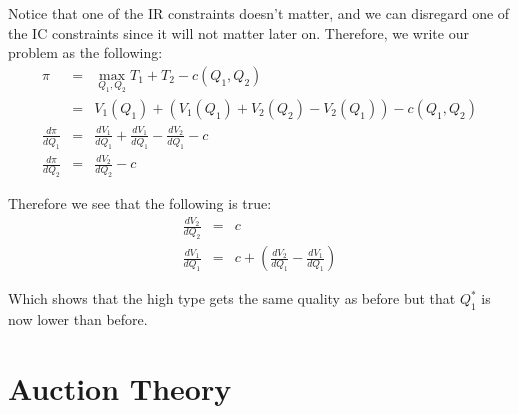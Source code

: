 \documentclass[12pt]{article}
\begin{document}
Notice that one of the IR constraints doesn't matter, and we can disregard one of the IC constraints since it will not matter later on. Therefore, we write our problem as the following:
\begin{eqnarray}
\pi &=& \max_{Q_1, Q_2} T_1 + T_2 - c(Q_1, Q_2) \\ 
 &=& V_1(Q_1) + (V_1(Q_1) + V_2(Q_2) - V_2(Q_1)) - c(Q_1, Q_2) \\
\frac{d \pi}{d Q_1} &=& \frac{d V_1}{d Q_1} + \frac{d V_1}{d Q_1} - \frac{d V_2}{d Q_1} - c \\
\frac{d \pi}{d Q_2} &=& \frac{d V_2}{d Q_2} - c 
\end{eqnarray}

Therefore we see that the following is true:
\begin{eqnarray}
\frac{d V_2}{d Q_2} &=& c \\
\frac{d V_1}{d Q_1} &=& c + \left( \frac{d V_2}{d Q_1} - \frac{d V_1}{d Q_1} \right)
\end{eqnarray}

Which shows that the high type gets the same quality as before but that $Q_1^*$ is now lower than before. 

\section{Auction Theory}
\end{document}
